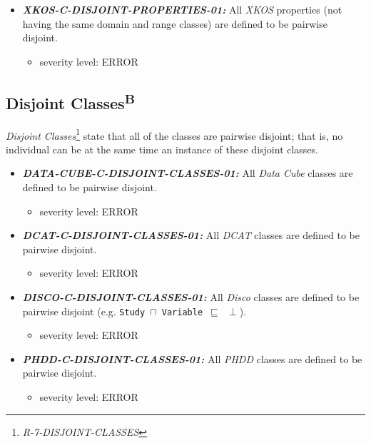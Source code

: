 \documentclass{llncs}
\newcommand{\ms}[1]{\texttt{#1}}
\begin{document}
\begin{itemize}
	\item \textbf{{\em XKOS-C-DISJOINT-PROPERTIES-01:}} 
	All \emph{XKOS} properties (not having the same domain and range classes) are defined to be pairwise disjoint.
	\begin{itemize}
		\item severity level: ERROR
	\end{itemize}
\end{itemize}

\subsection{Disjoint Classes\textsuperscript{B}}

{\em Disjoint Classes}\footnote{{\em R-7-DISJOINT-CLASSES}} state that all of the classes are pairwise disjoint; 
that is, no individual can be at the same time an instance of these disjoint classes.

\begin{itemize}
	\item \textbf{{\em DATA-CUBE-C-DISJOINT-CLASSES-01:}} 
All \emph{Data Cube} classes are defined to be pairwise disjoint.
\begin{itemize}
		\item severity level: ERROR
	\end{itemize}
\end{itemize}

\begin{itemize}
	\item \textbf{{\em DCAT-C-DISJOINT-CLASSES-01:}} 
All \emph{DCAT} classes are defined to be pairwise disjoint.
\begin{itemize}
		\item severity level: ERROR
	\end{itemize}
\end{itemize}

\begin{itemize}
	\item \textbf{{\em DISCO-C-DISJOINT-CLASSES-01:}} 
All \emph{Disco} classes are defined to be pairwise disjoint (e.g. \ms{Study $\sqcap$ Variable $\sqsubseteq$ $\perp$}).
\begin{itemize}
		\item severity level: ERROR
	\end{itemize}
\end{itemize}

\begin{itemize}
	\item \textbf{{\em PHDD-C-DISJOINT-CLASSES-01:}} 
All \emph{PHDD} classes are defined to be pairwise disjoint.
\begin{itemize}
		\item severity level: ERROR
	\end{itemize}
\end{itemize}
\end{document}
